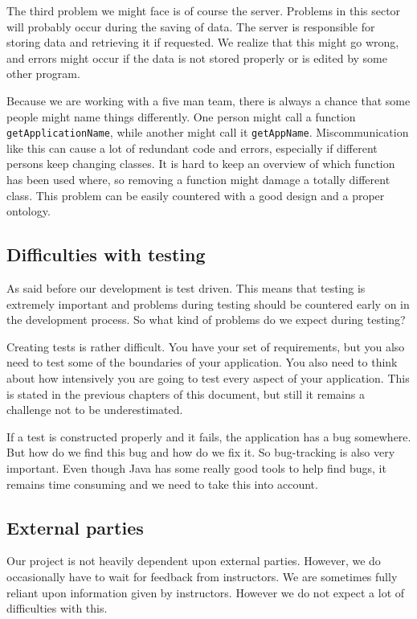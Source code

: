 \documentclass[a4paper]{article}
\begin{document}
The third problem we might face is of course the server. Problems in this sector will probably occur during the saving of data. The server is responsible for storing data and retrieving it if requested. We realize that this might go wrong, and errors might occur if the data is not stored properly or is edited by some other program. 

Because we are working with a five man team, there is always a chance that some people might name things differently. One person might call a function \verb|getApplicationName|, while another might call it \verb|getAppName|. Miscommunication like this can cause a lot of redundant code and errors, especially if different persons keep changing classes. It is hard to keep an overview of which function has been used where, so removing a function might damage a totally different class. This problem can be easily countered with a good design and a proper ontology.

\subsection{Difficulties with testing}
As said before our development is test driven. This means that testing is extremely important and problems during testing should be countered early on in the development process. So what kind of problems do we expect during testing?

Creating tests is rather difficult. You have your set of requirements, but you also need to test some of the boundaries of your application. You also need to think about how intensively you are going to test every aspect of your application. This is stated in the previous chapters of this document, but still it remains a challenge not to be underestimated.

If a test is constructed properly and it fails, the application has a bug somewhere. But how do we find this bug and how do we fix it. So bug-tracking is also very important. Even though Java has some really good tools to help find bugs, it remains time consuming and we need to take this into account.

\subsection{External parties}
Our project is not heavily dependent upon external parties. However, we do occasionally have to wait for feedback from instructors. We are sometimes fully reliant upon information given by instructors. However we do not expect a lot of difficulties with this.
\end{document}
